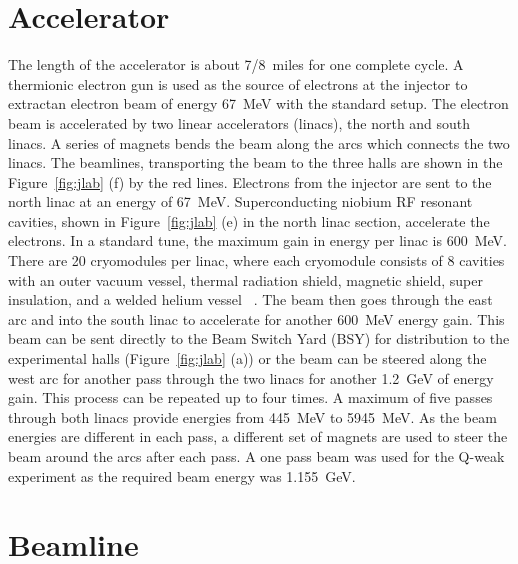 \section{Accelerator}%
\label{Accelerator}

The length of the accelerator is about 7/8~miles for one complete cycle. A thermionic electron gun is used as the source of electrons at the injector to extractan electron beam of energy 67~MeV with the standard setup. 
The electron beam is accelerated by two linear accelerators (linacs), the north and south linacs. A series of magnets bends the beam along the arcs which connects the two linacs. The beamlines, transporting the beam to the three halls are shown in the Figure~\ref{fig:jlab} (f) by the red lines. 
Electrons from the injector are sent to the north linac at an energy of 67~MeV. Superconducting niobium RF resonant cavities, shown in Figure~\ref{fig:jlab} (e) in the north linac section, accelerate the electrons.  In a standard tune, the maximum gain in energy per linac is 600~MeV. There are 20 cryomodules per linac, where each cryomodule consists of 8 cavities with an outer vacuum vessel, thermal radiation shield, magnetic shield, super insulation, and a welded helium vessel ~\cite{Leemann_CEBAF,kmyers_qweak}. The beam then goes through the east arc and into the south linac to accelerate for another 600~MeV energy gain. This beam can be sent directly to the Beam Switch Yard (BSY) for distribution to the experimental halls (Figure~\ref{fig:jlab} (a)) or the beam can be steered along the west arc for another pass through the two linacs for another 1.2~GeV of energy gain. This process can be repeated up to four times. A maximum of five passes  through both linacs provide energies from 445~MeV to 5945~MeV. As the beam energies are different in each pass, a different set of magnets are used to steer the beam around the arcs after each pass. A one pass beam was used for the Q-weak experiment as the required beam energy was 1.155~GeV.

\section{Beamline}%
\label{Beamline}

